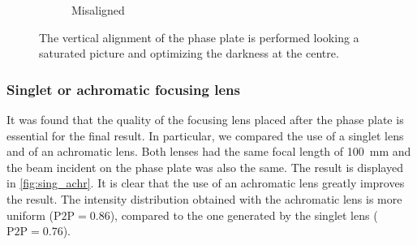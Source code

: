 \begin{figure}
\begin{subfigure}{0.3\textwidth}
        \caption{Misaligned}
    \end{subfigure}
    \caption{The vertical alignment of the phase plate is performed looking a saturated picture and optimizing the darkness at the centre.}
    \label{fig:alignment}
\end{figure}

\subsubsection{Singlet or achromatic focusing lens}
It was found that the quality of the focusing lens placed after the phase plate is essential for the final result. In particular, we compared the use of a singlet lens and of an achromatic lens. Both lenses had the same focal length of \SI{100}{mm} and the beam incident on the phase plate was also the same. The result is displayed in \cref{fig:sing_achr}. It is clear that the use of an achromatic lens greatly improves the result. The intensity distribution obtained with the achromatic lens is more uniform ($\text{P2P} = 0.86$), compared to the one generated by the singlet lens ($\text{P2P} =0.76$).
